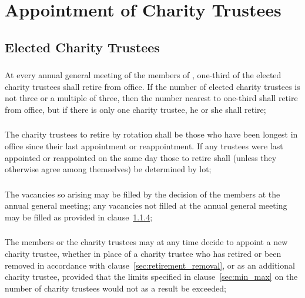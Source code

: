 \section{Appointment of Charity Trustees}\label{sec:appointment}

    \subsection{Elected Charity Trustees}

        \subsubsection{}\label{sec:one_third_retire}
        At every annual general meeting of the members of \shortname{}, one-third of the elected charity trustees shall retire from office. If the number of elected charity trustees is not three or a multiple of three, then the number nearest to one-third shall retire from office, but if there is only one charity trustee, he or she shall retire;

        \subsubsection{}\label{sec:rotation_retirement}
        The charity trustees to retire by rotation shall be those who have been longest in office since their last appointment or reappointment. If any trustees were last appointed or reappointed on the same day those to retire shall (unless they otherwise agree among themselves) be determined by lot;

        \subsubsection{}\label{sec:trustee_vacancy}
        The vacancies so arising may be  filled by the decision of the members at the annual general meeting; any vacancies not  filled at the annual general meeting may be  filled as provided in clause~\ref{sec:appoint_new_trustee};

        \subsubsection{}\label{sec:appoint_new_trustee}
        The members or the charity trustees may at any time decide to appoint a new charity trustee, whether in place of a charity trustee who has retired or been removed in accordance with clause~\ref{sec:retirement_removal}, or as an additional charity trustee, provided that the limits specified in clause~\ref{sec:min_max} on the number of charity trustees would not as a result be exceeded;


